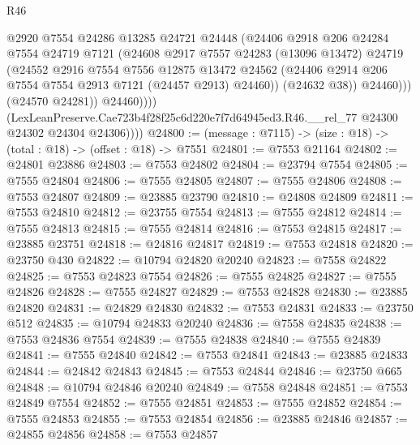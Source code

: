 \begin{lexlean}{R46}
\begin{coremodule}
                        @2920
                        @7554
                        @24286
                        @13285
                        @24721
                        @24448
                        (@24406
                          @2918
                          @206
                          @24284
                          @7554
                          @24719
                          @7121
                          (@24608
                            @2917
                            @7557
                            @24283
                            (@13096 @13472)
                            @24719
                            (@24552
                              @2916
                              @7554
                              @7556
                              @12875
                              @13472
                              @24562
                              (@24406 @2914 @206 @7554 @7554 @2913 @7121 (@24457 @2913) @24460))
                            (@24632 @38))
                          @24460)))
                    (@24570 @24281))
                  @24460))))
          (LexLeanPreserve.Cae723b4f28f25c6d220e7f7d64945ed3.R46.__rel_77
            @24300
            @24302
            @24304
            @24306))))
@24800 := (message : @7115) -> (size : @18) -> (total : @18) -> (offset : @18) -> @7551
@24801 := @7553 @21164
@24802 := @24801 @23886
@24803 := @7553 @24802
@24804 := @23794 @7554
@24805 := @7555 @24804
@24806 := @7555 @24805
@24807 := @7555 @24806
@24808 := @7553 @24807
@24809 := @23885 @23790
@24810 := @24808 @24809
@24811 := @7553 @24810
@24812 := @23755 @7554
@24813 := @7555 @24812
@24814 := @7555 @24813
@24815 := @7555 @24814
@24816 := @7553 @24815
@24817 := @23885 @23751
@24818 := @24816 @24817
@24819 := @7553 @24818
@24820 := @23750 @430
@24822 := @10794 @24820 @20240
@24823 := @7558 @24822
@24825 := @7553 @24823 @7554
@24826 := @7555 @24825
@24827 := @7555 @24826
@24828 := @7555 @24827
@24829 := @7553 @24828
@24830 := @23885 @24820
@24831 := @24829 @24830
@24832 := @7553 @24831
@24833 := @23750 @512
@24835 := @10794 @24833 @20240
@24836 := @7558 @24835
@24838 := @7553 @24836 @7554
@24839 := @7555 @24838
@24840 := @7555 @24839
@24841 := @7555 @24840
@24842 := @7553 @24841
@24843 := @23885 @24833
@24844 := @24842 @24843
@24845 := @7553 @24844
@24846 := @23750 @665
@24848 := @10794 @24846 @20240
@24849 := @7558 @24848
@24851 := @7553 @24849 @7554
@24852 := @7555 @24851
@24853 := @7555 @24852
@24854 := @7555 @24853
@24855 := @7553 @24854
@24856 := @23885 @24846
@24857 := @24855 @24856
@24858 := @7553 @24857

\end{coremodule}
\end{lexlean}
